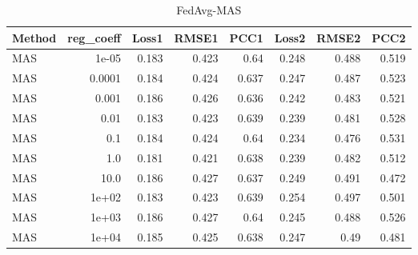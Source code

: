 \begin{table}
\caption{FedAvg-MAS}
\begin{tabular}{lrrrrrrr}
\toprule
Method & reg_coeff & Loss1 & RMSE1 & PCC1 & Loss2 & RMSE2 & PCC2 \\
\midrule
MAS & 1e-05 & 0.183 & 0.423 & 0.64 & 0.248 & 0.488 & 0.519 \\
MAS & 0.0001 & 0.184 & 0.424 & 0.637 & 0.247 & 0.487 & 0.523 \\
MAS & 0.001 & 0.186 & 0.426 & 0.636 & 0.242 & 0.483 & 0.521 \\
MAS & 0.01 & 0.183 & 0.423 & 0.639 & 0.239 & 0.481 & 0.528 \\
MAS & 0.1 & 0.184 & 0.424 & 0.64 & 0.234 & 0.476 & 0.531 \\
MAS & 1.0 & 0.181 & 0.421 & 0.638 & 0.239 & 0.482 & 0.512 \\
MAS & 10.0 & 0.186 & 0.427 & 0.637 & 0.249 & 0.491 & 0.472 \\
MAS & 1e+02 & 0.183 & 0.423 & 0.639 & 0.254 & 0.497 & 0.501 \\
MAS & 1e+03 & 0.186 & 0.427 & 0.64 & 0.245 & 0.488 & 0.526 \\
MAS & 1e+04 & 0.185 & 0.425 & 0.638 & 0.247 & 0.49 & 0.481 \\
\bottomrule
\end{tabular}
\end{table}
